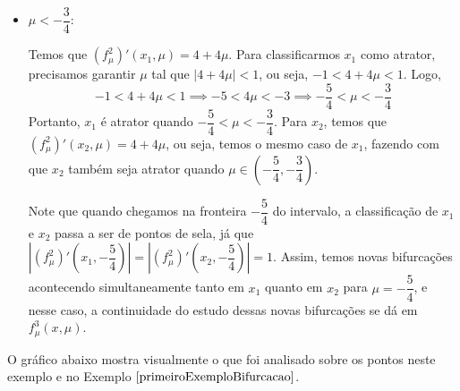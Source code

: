 \documentclass[../IC.tex]{subfiles}
\begin{document}
\begin{exemplo}
\begin{itemize}
			Temos que $x_1 = x_2 = -\dfrac{1}{2}$, portanto, um ponto periódico apenas. Para esse ponto, temos que sua classificação é de ponto de sela, indicando bifurcação, pois $\left|(f_\mu^2)'\left(-\dfrac{1}{2}, -\dfrac{3}{4}\right)\right| = 1$.
			
			\item $\mu < -\dfrac{3}{4}$:
			
			Temos que $(f_\mu^2)'(x_1, \mu) = 4+4\mu$. Para classificarmos $x_1$ como atrator, precisamos garantir $\mu$ tal que $|4+4\mu| < 1$, ou seja, $-1 < 4+4\mu < 1$. Logo, 
			$$-1 < 4+4\mu < 1 \implies -5 < 4\mu < -3 \implies -\dfrac{5}{4} < \mu < -\dfrac{3}{4}$$
			Portanto, $x_1$ é atrator quando $-\dfrac{5}{4} < \mu < -\dfrac{3}{4}$.
			Para $x_2$, temos que $(f_\mu^2)'(x_2, \mu) = 4+4\mu$, ou seja, temos o mesmo caso de $x_1$, fazendo com que $x_2$ também seja atrator quando $\mu \in \left(-\dfrac{5}{4},-\dfrac{3}{4}\right)$.
			
			Note que quando chegamos na fronteira $-\dfrac{5}{4}$ do intervalo, a classificação de $x_1$ e $x_2$ passa a ser de pontos de sela, já que 
			$\left|(f_\mu^2)'\left(x_1, -\dfrac{5}{4}\right)\right| = \left|(f_\mu^2)'\left(x_2, -\dfrac{5}{4}\right)\right| = 1$. Assim, temos novas bifurcações acontecendo simultaneamente tanto em $x_1$ quanto em $x_2$ para $\mu = -\dfrac{5}{4}$, e nesse caso, a continuidade do estudo dessas novas bifurcações se dá em $f_\mu^3(x, \mu)$.
			
		\end{itemize}
		O gráfico abaixo mostra visualmente o que foi analisado sobre os pontos neste exemplo e no Exemplo $\ref{primeiroExemploBifurcacao}$.
		\begin{figure}[H]
			\centering
\end{figure}
\end{exemplo}
\end{document}
